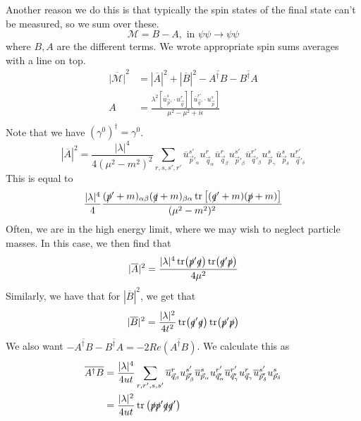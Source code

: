 Another reason we do this is that 
typically the spin states of the final state can't 
be measured, so we sum over these. 
\[
 \mathcal{ M } = B - A , \text{ in } \psi \psi \to \psi \psi 
\] where $ B , A $ are the different terms. 
We wrote appropriate spin sums averages with a line on top. 
\begin{align*}
	\overline{ | \mathcal{ M } | } ^ 2 &=  | \overline{ A } | ^ 2 
	+ | \overline{ B } | ^ 2 - \overline{ A ^ \dagger B } - 
	\overline{ B ^ \dagger A } \\
	A &=  \frac{\lambda ^ 2 \left[  \overline{u  }_{ \vec{p} ' } ^ s 
	\cdot  u_{ \vec{q} } ^ r  \right] \left[  
\overline{ u } _{ \vec{q} ' } ^{ r ' } \cdot  u_{ \vec{p} } ^ s \right]}{
\mu ^ 2- \mu ^ 2+ i \epsilon } \\
\end{align*}
Note that we have $ ( \gamma ^ 0 ) ^ \dagger  = \gamma ^ 0 $. 
 \[
	 | \overline{ A } | ^ 2 = \frac{ | \lambda | ^ 4  }{ 4 ( \mu ^ 2 - m ^ 2 ) ^ 2  } 
 \sum_{ r , s , s' , r ' } \overline{u }_{ \vec{p} ' _ \alpha } ^{ s ' } 
 u_{ \vec{q} _ \alpha } ^ r \overline{ u } _{ \vec{q} _ \beta } ^ r 
 u_{ \vec{p} ' _ \beta } ^{ s ' } \overline{u }_{ \vec{q} ' _ \beta } ^{ r ' } 
 u_{ \vec{p} _ \gamma } ^{ s } \overline{ u }_{ \vec{p} _ \delta } ^ s 
 u_{ \vec{q}' _ \delta } ^{ r ' }
\]  This 
is equal to 
\[
	\frac{ | \lambda |  ^ 4 }{ 4 } \frac{( \slashed{p}' + m)_{ \alpha \beta } 
	( \slashed{q} + m )_{ \beta \alpha } \tr \left[  
( \slashed{q}' + m ) (\slashed{p} + m )  \right] }{ ( \mu ^ 2 - m ^ 2 ) ^  2}
\] Often, we are in the high energy limit, 
where we may wish to neglect particle masses. In this 
case, we then find that 
\[	| \overline{ A } | ^ 2 = \frac{ | \lambda | ^ 4 \tr ( 
	\slashed{p} ' \slashed{q} ) \tr (\slashed{q} ' \slashed{p} ) }{4 \mu ^ 2 }
\] Similarly, we have that for $ | \overline{ B  } | ^ 2 $, 
we get that 
\[
 | \overline{ B } | ^ 2 = \frac{  | \lambda | ^ 2 }{ 4 t ^ 2 }
 \tr ( \slashed{q} ' \slashed{q} ) \tr ( \slashed{p} ' \slashed{p} ) 
\] We also want $  - \overline{ A ^ \dagger B  }  - \overline{ B ^ \dagger A }  = 
- 2 Re \overline{ ( A ^ \dagger B ) } $. 
We calculate this as 
\begin{align*}
	\overline{ A ^ \dagger B  } &  = \frac{ | \lambda | ^ 4 }{ 4 u t} 
	\sum_{ r , r' , s, s ' } \overline{u } _{ \vec{q} _ \beta } ^ r 
	u _{ \vec{p} ' _ \beta }^{ s' } \overline{ u } _{ \vec{p} _ \alpha } ^ s 
	u _{ \vec{q} ' _ \alpha } ^{ r '} \overline{ u } _{ \vec{q}' _ \gamma } ^{ r ' } 
	u_{ \vec{q} _ \gamma } ^ r \overline{ u } _{ \vec{p} ' _ \delta } ^{ s' } 
	u _{ \vec{p} _ \delta } ^ s \\
				    &=  \frac{|\lambda | ^ 2 }{ 4 ut } \tr \left(  
				    \slashed{p} \slashed{p} ' 
			    \slashed{q} \slashed{q}' \right)  \\
\end{align*} 

